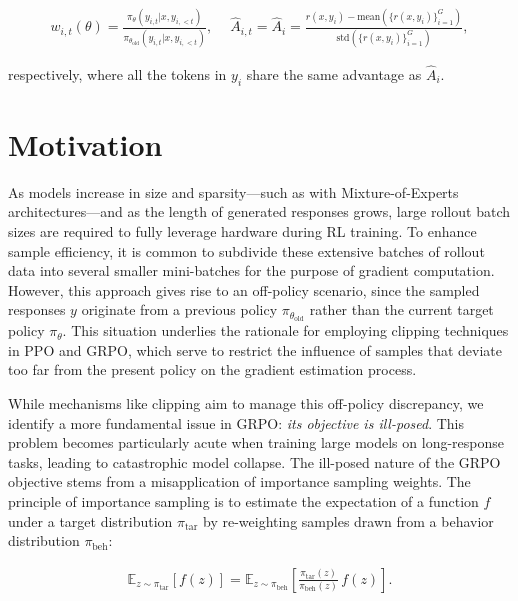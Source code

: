 \begin{align}
    w_{i,t}(\theta)=\frac{ \pi_{\theta} (y_{i,t} | x, y_{i,<t}) }{ \pi_{\theta_\text{old}} (y_{i,t} | x,y_{i,<t})},\quad\ 
    \widehat{A}_{i,t} = \widehat{A}_{i} = \frac{r(x, y_i) - \mathrm{mean} \left( \{ r(x, y_i) \}_{i=1}^G \right) }{ \mathrm{std} \left( \{ r(x, y_i) \}_{i=1}^G \right) },
\end{align}

respectively, where all the tokens in $y_i$ share the same advantage as $\widehat{A}_{i}$.

\section{Motivation}
\label{sec:motivation}

As models increase in size and sparsity—such as with Mixture-of-Experts architectures—and as the length of generated responses grows, large rollout batch sizes are required to fully leverage hardware during RL training. To enhance sample efficiency, it is common to subdivide these extensive batches of rollout data into several smaller mini-batches for the purpose of gradient computation. However, this approach gives rise to an off-policy scenario, since the sampled responses $y$ originate from a previous policy $\pi_{\theta_\text{old}}$ rather than the current target policy $\pi_\theta$. This situation underlies the rationale for employing clipping techniques in PPO and GRPO, which serve to restrict the influence of samples that deviate too far from the present policy on the gradient estimation process.

While mechanisms like clipping aim to manage this off-policy discrepancy, we identify a more fundamental issue in GRPO: \textit{its objective is ill-posed}. This problem becomes particularly acute when training large models on long-response tasks, leading to catastrophic model collapse. The ill-posed nature of the GRPO objective stems from a misapplication of importance sampling weights. The principle of importance sampling is to estimate the expectation of a function $f$ under a target distribution $\pi_\text{tar}$ by re-weighting samples drawn from a behavior distribution $\pi_\text{beh}$:

\begin{align}
\mathbb{E}_{z \sim \pi_\text{tar}} \left[ f(z) \right] = \mathbb{E}_{z \sim \pi_\text{beh}} \left[ \frac{ \pi_\text{tar} (z) }{ \pi_\text{beh} (z)} \, f(z) \right].
\end{align}

